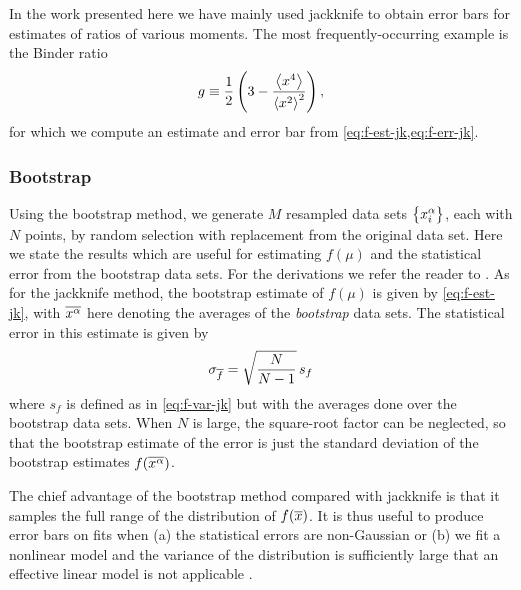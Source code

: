 In the work presented here we have mainly used jackknife to obtain error bars
for estimates of ratios of various moments. The most frequently-occurring
example is the Binder ratio
\begin{equation}
  g \equiv \frac{1}{2} \left(3 - \frac{\left< x^4 \right>}{\left< x^2 \right>^2}\right),
\end{equation}
for which we compute an estimate and error bar from
\cref{eq:f-est-jk,eq:f-err-jk}.


\subsubsection{Bootstrap}

Using the bootstrap method, we generate $M$ resampled data sets
$\cbr{x_i^{\alpha}}$, each with $N$ points, by random selection with
replacement from the original data set. Here we state the results which are
useful for estimating $f(\mu)$ and the statistical error from the bootstrap
data sets. For the derivations we refer the reader to
\textcite{young2015everything}. As for the jackknife method, the bootstrap
estimate of $f(\mu)$ is given by \cref{eq:f-est-jk}, with $\overline{x^{\alpha}}$
here denoting the averages of the \emph{bootstrap} data sets. The statistical
error in this estimate is given by
\begin{equation}
  \sigma_{\overline{f}} = \sqrt{\frac{N}{N-1}}\,s_f
\end{equation}
where $s_f$ is defined as in \cref{eq:f-var-jk} but with the averages done over
the bootstrap data sets. When $N$ is large, the square-root factor can be
neglected, so that the bootstrap estimate of the error is just the standard
deviation of the bootstrap estimates $f(\overline{x^{\alpha}})$.

The chief advantage of the bootstrap method compared with jackknife is that it
samples the full range of the distribution of $f(\overline{x})$. It is thus useful
to produce error bars on fits when (a) the statistical errors are non-Gaussian
or (b) we fit a nonlinear model and the variance of the distribution is
sufficiently large that an effective linear model is not applicable
\textcite{young2015everything}.


